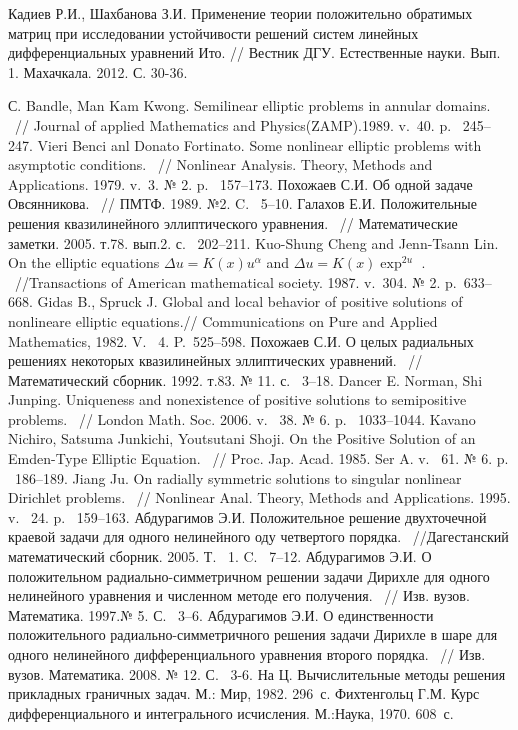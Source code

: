 \begin{thebibliography}{111}
	Кадиев Р.И., Шахбанова З.И. Применение теории положительно обратимых матриц при исследовании устойчивости решений
	систем линейных дифференциальных уравнений Ито. // Вестник ДГУ. Естественные науки. Вып. 1. Махачкала. 2012. С.
	30-36.












 С. Bandle, Man Kam Kwong. Semilinear elliptic problems in annular domains.
  ~// Journal of applied Mathematics and Physics(ZAMP).1989. v.~40. p. ~245--247.
 Vieri Benci anl Donato Fortinato. Some nonlinear elliptic problems
with asymptotic conditions. ~// Nonlinear Analysis. Theory, Methods
and Applications.  1979. v.~3. № 2. p. ~157--173.
 Похожаев С.И. Об одной задаче Овсянникова. ~// ПМТФ. 1989. №2. C. ~5--10.
Галахов Е.И. Положительные решения квазилинейного эллиптического
уравнения. ~// Математические заметки. 2005. т.78. вып.2. с.
~202--211.
 Kuo-Shung Cheng and Jenn-Tsann Lin. On the elliptic equations
$ \Delta u=K(x)u^{\alpha} $   and $ \Delta u=K(x)\exp^{2u} $  .
 ~//Transactions of American mathematical society. 1987. v.~304.
№ 2. p.~633--668.
 Gidas B., Spruck  J.  Global and local behavior of positive solutions
of nonlineare elliptic equations.//  Communications on Pure and
Applied Mathematics,  1982. V.~ 4. P.~525--598.
Похожаев С.И. О целых радиальных решениях некоторых квазилинейных
эллиптических уравнений. ~// Математический сборник. 1992. т.83.
№ 11. с. ~3--18.
Dancer E. Norman, Shi Junping. Uniqueness and nonexistence of
positive solutions to semipositive problems. ~// London Math. Soc.
2006. v. ~38. № 6.  p. ~1033--1044.
Kavano Nichiro, Satsuma Junkichi, Youtsutani Shoji. On the Positive
Solution of an Emden-Type Elliptic Equation. ~// Proc. Jap. Acad.
1985.  Ser A. v. ~61. № 6. p. ~186--189.
Jiang Ju. On radially  symmetric solutions to singular nonlinear
Dirichlet problems. ~// Nonlinear Anal. Theory, Methods and
Applications. 1995. v. ~24.  p. ~159--163.
 Абдурагимов Э.И. Положительное решение двухточечной краевой задачи для
одного нелинейного оду четвертого порядка. ~//Дагестанский
математический сборник. 2005. Т. ~1. C. ~7--12.
 Абдурагимов Э.И. О положительном радиально-симметричном решении
 задачи Дирихле для одного нелинейного  уравнения и численном методе
 его получения. ~// Изв. вузов. Математика. 1997.№ 5. С. ~3--6.
Абдурагимов Э.И. О единственности положительного
радиально-симметричного решения задачи Дирихле в шаре для одного
нелинейного дифференциального уравнения второго порядка. ~// Изв.
вузов. Математика. 2008. № 12. С. ~3-6.
 На Ц. Вычислительные методы решения прикладных граничных задач.
 М.: Мир, 1982. 296~с.
Фихтенгольц Г.М. Курс дифференциального и интегрального исчисления.
М.:Наука, 1970. 608~с.




\end{thebibliography}
